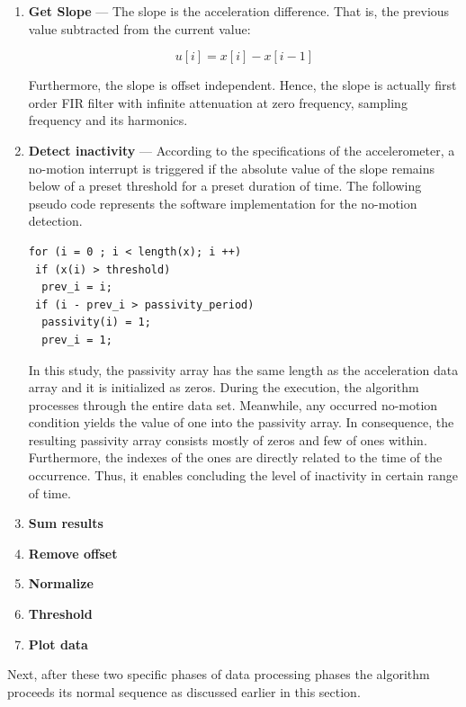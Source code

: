 \documentclass[english,12pt,a4paper,pdftex,elec,utf8]{aaltothesis}
\newcommand{\Clanguage}{\lstset{
  language=C++,                %
  basicstyle=\ttfamily,
  title=\lstname,                 %
}}
\begin{document}
\begin{enumerate}
\item \textbf{Get Slope} --- The slope is the acceleration difference. That is, the previous value subtracted from the current value: 

\begin{equation}
u[i] = x[i] - x[i-1]
\end{equation}

Furthermore, the slope is offset independent. Hence, the slope is actually first order FIR filter with infinite attenuation at zero frequency, sampling frequency and its harmonics. \\

\item \textbf{Detect inactivity} --- According to the specifications of the accelerometer, a no-motion interrupt is triggered if the absolute value of the slope remains below of a preset threshold for a preset duration of time. The following pseudo code represents the software implementation for the no-motion detection. \\

\Clanguage
\begin{lstlisting}
for (i = 0 ; i < length(x); i ++)
 if (x(i) > threshold)	
  prev_i = i;
 if (i - prev_i > passivity_period)
  passivity(i) = 1;
  prev_i = 1;	
\end{lstlisting}

In this study, the passivity array has the same length as the acceleration data array and it is initialized as zeros. During the execution, the algorithm processes through the entire data set. Meanwhile, any occurred no-motion condition yields the value of one into the passivity array. In consequence, the resulting passivity array consists mostly of zeros and few of ones within. Furthermore, the indexes of the ones are directly related to the time of the occurrence. Thus, it enables concluding the level of inactivity in certain range of time. \\


\item \textbf{Sum results}
\item \textbf{Remove offset}
\item \textbf{Normalize}
\item \textbf{Threshold}
\item \textbf{Plot data}


\end{enumerate}

Next, after these two specific phases of data processing phases the algorithm proceeds its normal sequence as discussed earlier in this section. \\
\end{document}
